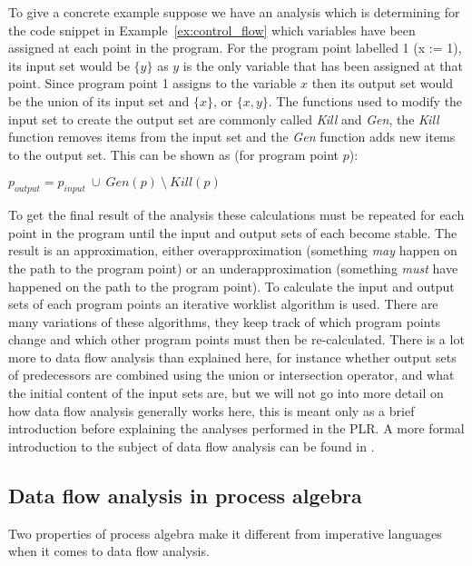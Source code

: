 	To give a concrete example suppose we have an analysis which is determining 
	for the code snippet in Example~\ref{ex:control_flow} which variables have 
	been assigned at each point in the program. For the program point labelled 1 
	(x := 1), its input set would be $\{y\}$ as $y$ is the only variable that 
	has been assigned at that point. Since program point 1 assigns to the 
	variable $x$ then its output set would be the union of its input set and 
	$\{x\}$, or $\{x,y\}$. The functions used to modify the input set to create 
	the output set are commonly called \textit{Kill} and \textit{Gen}, the 
	\textit{Kill} function removes items from the input set and the \textit{Gen} 
	function adds new items to the output set. This can be shown as (for program 
	point $p$):
	
	\begin{center}
	$p_{output} = p_{input}\ \cup\ Gen(p)\ \setminus\ Kill(p) $
	\end{center}
	
	To get the final result of the analysis these calculations must be repeated 
	for each point in the program until the input and output sets of each become 
	stable. The result is an approximation, either overapproximation (something 
	\textit{may} happen on the path to the program point) or an 
	underapproximation (something \textit{must} have happened on the path to the 
	program point).  To calculate the input and output sets of each program 
	points an iterative worklist algorithm is used. There are many variations of 
	these algorithms, they keep track of which program points change and which 
	other program points must then be re-calculated. There is a lot more to data 
	flow analysis than explained here, for instance whether output sets of 
	predecessors are combined using the union or intersection operator, and what 
	the initial content of the input sets are, but we will not go into more 
	detail on how data flow analysis generally works here, this is meant only as 
	a brief introduction before explaining the analyses performed in the PLR. A 
	more formal introduction to the subject of data flow analysis can be found 
	in \cite{program_analysis}.
	
	\subsection{Data flow analysis in process algebra}
	
	Two properties of process algebra make it different from imperative 	
	languages when it comes to data flow analysis.
	
